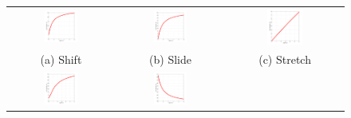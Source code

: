 \begin{figure}[t]
\centering
\begin{tabular}{ccc}
\includegraphics[width=0.33\textwidth]{graphs/shift/shiftBenefitNew.pdf} &
\includegraphics[width=0.33\textwidth]{graphs/slide/slideBenefitNew.pdf} &
\includegraphics[width=0.33\textwidth]{graphs/stretch/stretchBenefitNew.pdf}\\
(a) Shift & (b) Slide & (c) Stretch\\
\includegraphics[width=0.33\textwidth]{graphs/store/storageBenefitNew.pdf} &
\includegraphics[width=0.33\textwidth]{graphs/sell/sellBenefitNew.pdf} &

\end{tabular}
\end{figure}
